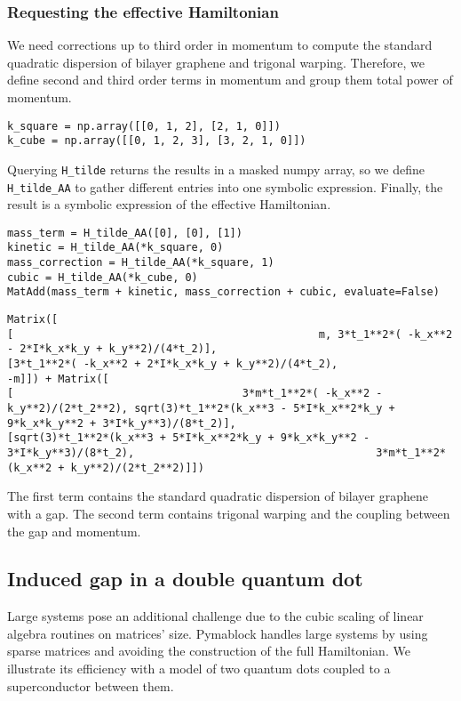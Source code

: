 \subsubsection{Requesting the effective Hamiltonian}

We need corrections up to third order in momentum to compute the standard
quadratic dispersion of bilayer graphene and trigonal warping.
Therefore, we define second and third order terms in momentum and group them
total power of momentum.
%
\begin{verbatim}
k_square = np.array([[0, 1, 2], [2, 1, 0]])
k_cube = np.array([[0, 1, 2, 3], [3, 2, 1, 0]])
\end{verbatim}
%
Querying \texttt{H\_tilde} returns the results in a masked numpy array, so we
define \texttt{H\_tilde\_AA} to gather different entries into one symbolic expression.
Finally, the result is a symbolic expression of the effective Hamiltonian.
%
\begin{verbatim}
mass_term = H_tilde_AA([0], [0], [1])
kinetic = H_tilde_AA(*k_square, 0)
mass_correction = H_tilde_AA(*k_square, 1)
cubic = H_tilde_AA(*k_cube, 0)
MatAdd(mass_term + kinetic, mass_correction + cubic, evaluate=False)
\end{verbatim}
%
\begin{verbatim}
Matrix([
[                                                m, 3*t_1**2*( -k_x**2 - 2*I*k_x*k_y + k_y**2)/(4*t_2)],
[3*t_1**2*( -k_x**2 + 2*I*k_x*k_y + k_y**2)/(4*t_2),                                                -m]]) + Matrix([
[                                    3*m*t_1**2*( -k_x**2 - k_y**2)/(2*t_2**2), sqrt(3)*t_1**2*(k_x**3 - 5*I*k_x**2*k_y + 9*k_x*k_y**2 + 3*I*k_y**3)/(8*t_2)],
[sqrt(3)*t_1**2*(k_x**3 + 5*I*k_x**2*k_y + 9*k_x*k_y**2 - 3*I*k_y**3)/(8*t_2),                                      3*m*t_1**2*(k_x**2 + k_y**2)/(2*t_2**2)]])
\end{verbatim}
%
The first term contains the standard quadratic dispersion of bilayer graphene
with a gap.
The second term contains trigonal warping and the coupling between the gap and
momentum.

\subsection{Induced gap in a double quantum dot}

Large systems pose an additional challenge due to the cubic scaling of linear algebra
routines on matrices' size.
Pymablock handles large systems by using sparse matrices and avoiding the
construction of the full Hamiltonian.
We illustrate its efficiency with a model of two quantum dots coupled to a
superconductor between them.

